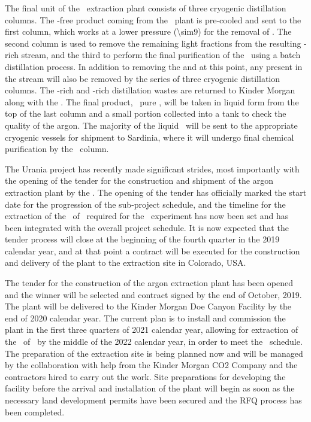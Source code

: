 The final unit of the \UAr\ extraction plant consists of three cryogenic distillation columns.  The -free product coming from the \PSA\ plant is pre-cooled and sent to the first column, which works at a lower pressure (\SI{\sim9}{\barg}) for the removal of .  The second column is used to remove the remaining light fractions from the resulting -rich stream, and the third to perform the final purification of the \UAr\ using a batch distillation process.  In addition to removing the  and  at this point, any  present in the stream will also be removed by the series of three cryogenic distillation columns.  The -rich and -rich distillation wastes are returned to Kinder Morgan along with the .  The final product, \UraniaArFinalPurity\ pure \UAr, will be taken in liquid form from the top of the last column and a small portion collected into a tank to check the quality of the argon.  The majority of the liquid \UAr\ will be sent to the appropriate cryogenic vessels for shipment to Sardinia, where it will undergo final chemical purification by the \SeruciOne\ column.

The Urania project has recently made significant strides, most importantly with the opening of the tender for the construction and shipment of the argon extraction plant by the \INFN.  The opening of the tender has officially marked the start date for the progression of the sub-project schedule, and the timeline for the extraction of the \UraniaTotalDSkProduction\ of \UAr\ required for the \DSks\ experiment has now been set and has been integrated with the overall project schedule.  It is now expected that the tender process will close at the beginning of the fourth quarter in the 2019 calendar year, and at that point a contract will be executed for the construction and delivery of the plant to the extraction site in Colorado, USA.  

The tender for the construction of the argon extraction plant has been opened and the winner will be selected and contract signed by the end of October, 2019. The plant will be delivered to the Kinder Morgan Doe Canyon Facility by the end of 2020 calendar year. The current plan is to install and commission the plant in the first three quarters of 2021 calendar year, allowing for extraction of the \UraniaTotalDSkProduction\ of \UAr\ by the middle of the 2022 calendar year, in order to meet the \DSk\ schedule. The preparation of the extraction site is being planned now and will be managed by the collaboration with help from the Kinder Morgan CO2 Company and the contractors hired to carry out the work. Site preparations for developing the facility before the arrival and installation of the plant will begin as soon as the necessary land development permits have been secured and the RFQ process has been completed. 

